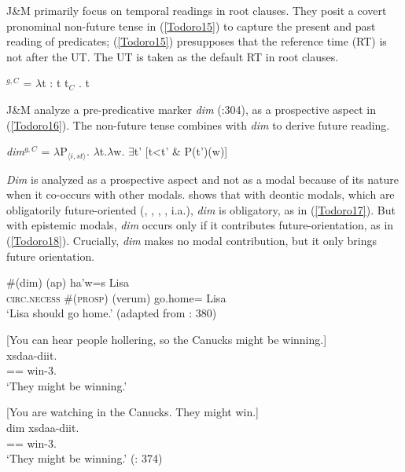 \documentclass[output=paper]{langscibook}
\begin{document}
J\&M primarily focus on temporal readings in root clauses. They posit a covert pronominal non-future tense in (\ref{Todoro15}) to capture the present and past reading of predicates; (\ref{Todoro15}) presupposes that the reference time (RT) is not after the UT. The UT is taken as the default RT in root clauses. 

\begin{exe}
\ex \label{Todoro15}
\textlbrackdbl{}\textrbrackdbl$^{g,C}$ = {$\lambda$}t : t {\leq} t$_{C}$ . t
\end{exe}

J\&M analyze a pre-predicative marker \emph{dim} (\citealt{rigsby1986a}:304), as a prospective aspect in (\ref{Todoro16}). The non-future tense combines with \textit{dim} to derive future reading.

\begin{exe}
\ex \label{Todoro16}\textlbrackdbl\emph{dim}\textrbrackdbl$^{g,C}$ = {$\lambda$}P$_{\langle i,st\rangle}$. {$\lambda$}t.{$\lambda$}w. {$\exists$}t' [t<t’ \& P(t’)(w)]
\end{exe}

\emph{Dim} is analyzed as a prospective aspect and not as a modal because of its nature when it co-occurs with other modals. \citet{matthewson2013a} shows that with deontic modals, which are obligatorily future-oriented (\citealt{abusch2012a}, \citealt{thomas2014a}, \citealt{klecha2011a}, \citealt{chen2017a}, i.a.),  \emph{dim} is obligatory, as in (\ref{Todoro17}). But with epistemic modals, \emph{dim} occurs only if it contributes future-orientation, as in (\ref{Todoro18}). Crucially, \emph{dim} makes no modal contribution, but it only brings future orientation.

\begin{exe}
\ex \label{Todoro17}
 \#({dim}) ({ap}) {ha'w=s} {Lisa} \\
    \textsc{circ.necess} \#(\textsc{prosp}) (\tsc{}verum) go.home={\pn} Lisa\\
\glt `Lisa should go home.' (adapted from \citealt{matthewson2013a}: 380) 

\ex \label{Todoro18}
\begin{xlist}

\ex \label{Todoro18a} [{You can hear people hollering, so the Canucks might be winning.}] \\
	{xsdaa-diit}. \\
    =={\cn} win-3{\pl}.{\seriesII} \\
\glt `They might be winning.' 

\ex \label{Todoro18b} [{You are watching in the Canucks. They might win.}]\\
 {dim} {xsdaa-diit}. \\
    =={\cn}  win-3{\pl}.{\seriesII} \\
\glt `They might be winning.' (\citealt{matthewson2013a}: 374)

\end{xlist}
\end{exe}
\end{document}
